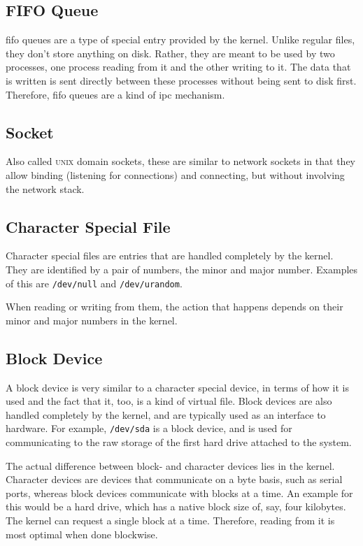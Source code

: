 \documentclass[a4paper]{article}
\begin{document}
\subsection{FIFO Queue}

\gls{fifo} queues are a type of special entry provided by the kernel. Unlike regular files, they don't store anything on disk. Rather, they are meant to be used by two processes, one process reading from it and the other writing to it. The data that is written is sent directly between these processes without being sent to disk first. Therefore, \gls{fifo} queues are a kind of \gls{ipc} mechanism.

\subsection{Socket}

Also called \textsc{unix} domain sockets, these are similar to network sockets in that they allow binding (listening for connections) and connecting, but without involving the network stack.

\subsection{Character Special File}

Character special files are entries that are handled completely by the kernel. They are identified by a pair of numbers, the minor and major number. Examples of this are \verb|/dev/null| and \verb|/dev/urandom|.

When reading or writing from them, the action that happens depends on their minor and major numbers in the kernel.

\subsection{Block Device}

A block device is very similar to a character special device, in terms of how it is used and the fact that it, too, is a kind of virtual file. Block devices are also handled completely by the kernel, and are typically used as an interface to hardware. For example, \verb|/dev/sda| is a block device, and is used for communicating to the raw storage of the first hard drive attached to the system. 

The actual difference between block- and character devices lies in the kernel. Character devices are devices that communicate on a byte basis, such as serial ports, whereas block devices communicate with blocks at a time. An example for this would be a hard drive, which has a native block size of, say, four kilobytes. The kernel can request a single block at a time. Therefore, reading from it is most optimal when done blockwise.
\end{document}
